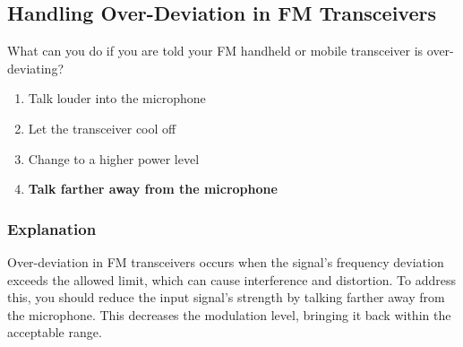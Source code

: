 \subsection{Handling Over-Deviation in FM Transceivers}
\label{T7B01}

\begin{tcolorbox}[colback=gray!10!white,colframe=black!75!black,title=T7B01]
What can you do if you are told your FM handheld or mobile transceiver is over-deviating?
\begin{enumerate}[noitemsep]
    \item Talk louder into the microphone
    \item Let the transceiver cool off
    \item Change to a higher power level
    \item \textbf{Talk farther away from the microphone}
\end{enumerate}
\end{tcolorbox}

\subsubsection*{Explanation}
Over-deviation in FM transceivers occurs when the signal's frequency deviation exceeds the allowed limit, which can cause interference and distortion. To address this, you should reduce the input signal's strength by talking farther away from the microphone. This decreases the modulation level, bringing it back within the acceptable range.